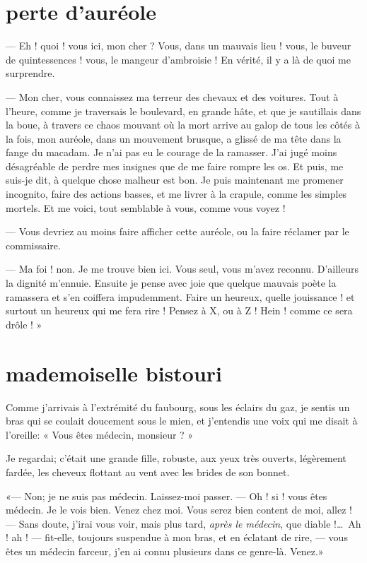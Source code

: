 \quebra\section[Perte d’auréole]{perte d’auréole}
--- Eh ! quoi ! vous ici, mon cher ? Vous, dans un mauvais lieu ! vous, le
buveur de quintessences ! vous, le mangeur d’ambroisie
! En vérité, il y a là de quoi me surprendre.

--- Mon cher, vous connaissez ma terreur des chevaux et des voitures. Tout
à l’heure, comme je traversais le boulevard, en grande
hâte, et que je sautillais dans la boue, à travers ce chaos mouvant où
la mort arrive au galop de tous les côtés à la fois, mon auréole, dans
un mouvement brusque, a glissé de ma tête dans la fange du macadam. Je
n’ai pas eu le courage de la ramasser.
J’ai jugé moins désagréable de perdre mes insignes que
de me faire rompre les os. Et puis, me suis{}-je dit, à quelque chose
malheur est bon. Je puis maintenant me promener incognito, faire des
actions basses, et me livrer à la crapule, comme les simples mortels.
Et me voici, tout semblable à vous, comme vous voyez !

--- Vous devriez au moins faire afficher cette auréole, ou la faire
réclamer par le commissaire.

--- Ma foi ! non. Je me trouve bien ici. Vous seul, vous
m’avez reconnu. D’ailleurs la dignité
m’ennuie. Ensuite je pense avec joie que quelque
mauvais poète la ramassera et s’en coiffera
impudemment. Faire un heureux, quelle jouissance ! et surtout un
heureux qui me fera rire ! Pensez à X, ou à Z ! Hein ! comme ce sera
drôle ! »

\quebra\section[Mademoiselle bistouri]{mademoiselle bistouri} 

Comme j’arrivais à l’extrémité du
faubourg, sous les éclairs du gaz, je sentis un bras qui se coulait
doucement sous le mien, et j’entendis une voix qui me
disait à l’oreille: « Vous êtes médecin, monsieur ? »

Je regardai; c’était une grande fille, robuste, aux
yeux très ouverts, légèrement fardée, les cheveux flottant au vent
avec les brides de son bonnet.

«--- Non; je ne suis pas médecin. Laissez{}-moi passer. --- Oh ! si ! vous
êtes médecin. Je le vois bien. Venez chez moi. Vous serez bien content
de moi, allez ! --- Sans doute, j’irai vous voir, mais
plus tard, \textit{après le médecin}, que diable !\ldots\ Ah ! ah ! --- fit{}-elle,
toujours suspendue à mon bras, et en éclatant de rire, --- vous êtes un
médecin farceur, j’en ai connu plusieurs dans ce
genre{}-là. Venez.»


